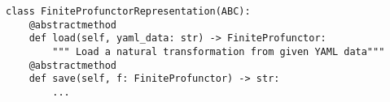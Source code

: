 \par\begin{minipage}{65ex}
\begin{verbatim}
class FiniteProfunctorRepresentation(ABC):
    @abstractmethod
    def load(self, yaml_data: str) -> FiniteProfunctor:
        """ Load a natural transformation from given YAML data"""
    @abstractmethod
    def save(self, f: FiniteProfunctor) -> str:
        ...
\end{verbatim}
\end{minipage}\par